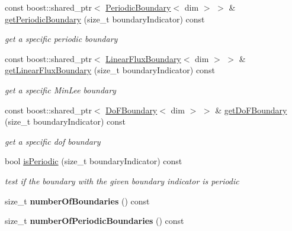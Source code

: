 \begin{DoxyCompactItemize}
const boost::shared\_\-ptr$<$ \hyperlink{classnatrium_1_1PeriodicBoundary}{PeriodicBoundary}$<$ dim $>$ $>$ \& \hyperlink{classnatrium_1_1BoundaryCollection_aea0ba68a319b3ec0f3774ba814e18217}{getPeriodicBoundary} (size\_\-t boundaryIndicator) const 
\begin{DoxyCompactList}\small\item\em get a specific periodic boundary \item\end{DoxyCompactList}\item 
const boost::shared\_\-ptr$<$ \hyperlink{classnatrium_1_1LinearFluxBoundary}{LinearFluxBoundary}$<$ dim $>$ $>$ \& \hyperlink{classnatrium_1_1BoundaryCollection_a7961dc115c0a8cd29fa5cf6f553aa78f}{getLinearFluxBoundary} (size\_\-t boundaryIndicator) const 
\begin{DoxyCompactList}\small\item\em get a specific MinLee boundary \item\end{DoxyCompactList}\item 
const boost::shared\_\-ptr$<$ \hyperlink{classnatrium_1_1DoFBoundary}{DoFBoundary}$<$ dim $>$ $>$ \& \hyperlink{classnatrium_1_1BoundaryCollection_ad63f4c0e71eaa277f263d39415175549}{getDoFBoundary} (size\_\-t boundaryIndicator) const 
\begin{DoxyCompactList}\small\item\em get a specific dof boundary \item\end{DoxyCompactList}\item 
\hypertarget{classnatrium_1_1BoundaryCollection_aec4a9de4aaccaa7a49e5308bf9812c66}{
bool \hyperlink{classnatrium_1_1BoundaryCollection_aec4a9de4aaccaa7a49e5308bf9812c66}{isPeriodic} (size\_\-t boundaryIndicator) const }
\label{classnatrium_1_1BoundaryCollection_aec4a9de4aaccaa7a49e5308bf9812c66}

\begin{DoxyCompactList}\small\item\em test if the boundary with the given boundary indicator is periodic \item\end{DoxyCompactList}\item 
\hypertarget{classnatrium_1_1BoundaryCollection_ad9dbba7ffccaa31ee79cace73197148e}{
size\_\-t {\bfseries numberOfBoundaries} () const }
\label{classnatrium_1_1BoundaryCollection_ad9dbba7ffccaa31ee79cace73197148e}

\item 
\hypertarget{classnatrium_1_1BoundaryCollection_a62004be7508761795d894ed7ca7e4eb8}{
size\_\-t {\bfseries numberOfPeriodicBoundaries} () const }
\label{classnatrium_1_1BoundaryCollection_a62004be7508761795d894ed7ca7e4eb8}


\end{DoxyCompactItemize}
